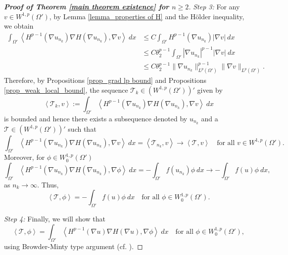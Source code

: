 \documentclass[11pt]{amsart}
\newcommand{\Fin}[1]{H^{p-1}(\nabla #1)\nabla H(\nabla #1)}
\numberwithin{equation}{section}
\begin{document}
\begin{proof}[\textbf{Proof of Theorem \ref{main theorem existence} for $n\geq 2$}]
\textit{Step 3:}
     For any $v\in W^{1,p}(\Omega')$, by Lemma \ref{lemma_properties of H} and the H\"older inequality, we obtain 
    \begin{equation*}
    \begin{split}
         \int_{\Omega'}\left<\Fin{u_{n_{k}}}, \nabla v\right> \ dx & \leq C \int_{\Omega'}H^{p-1}(\nabla u_{n_{k}}) |\nabla v| \ dx \\
         & \leq C\theta_{2}^{p-1}\int_{\Omega'} |\nabla u_{n_{k}}|^{p-1}|\nabla v|\ dx \\
         &\leq  C\theta_{2}^{p-1} \|\nabla u_{n_{k}}\|^{p-1}_{L^{p}(\Omega')} \|\nabla v\|_{L^{p}(\Omega')}.
    \end{split}
    \end{equation*}
    Therefore, by Propositions \ref{prop_grad lp bound} and Propositions \ref{prop_weak_local_bound}, the sequence $\mathcal{T}_{k}\in \left(W^{1,p}(\Omega')\right)'$ given by 
    \begin{equation*}
        \left<\mathcal{T}_{k}, v\right>:=\int_{\Omega'}\left<\Fin{u_{n_{k}}} , \nabla v\right>\ dx
    \end{equation*}
    is bounded and hence there exists a subsequence denoted by $u_{n_{k}}$ and a $\mathcal{T}\in \left(W^{1,p}(\Omega')\right)'$ such that 
    \begin{equation}\label{eqn weak convergence in dual}
        \int_{\Omega'} \left<\Fin{u_{n_{k}}}, \nabla v\right> \ dx=\left<\mathcal{T}_{n_{k}}, v\right> \to \left<\mathcal{T}, v\right> \quad \text{for all } v\in  W^{1,p}(\Omega').
    \end{equation}
    Moreover, for $\phi\in W_{0}^{1,p}(\Omega')$
    \begin{equation*}
        \int_{\Omega'} \left<\Fin{u_{n_{k}}}, \nabla \phi \right>\ dx= -\int_{\Omega'}f(u_{n_{k}})\phi \ dx \to -\int_{\Omega'}f(u)\phi \ dx,
    \end{equation*}
    as $n_{k}\to \infty$. Thus, 
    \begin{equation}\label{L equals to f}
        \left<\mathcal{T}, \phi\right>=-\int_{\Omega'}f(u)\phi \ dx \quad \text{for all } \phi\in W_{0}^{1,p}(\Omega').
    \end{equation}

    \textit{Step 4:}
    Finally, we will show that
    \begin{equation*}
        \left<\mathcal{T}, \phi\right>=\int_{\Omega'} \left<\Fin{u}, \nabla \phi \right> \ dx \quad \text{for all } \phi \in W_{0}^{1,p}(\Omega'),
    \end{equation*}
     using Browder-Minty type argument (cf. \cite{Zeidler1990,evans}).
    

\end{proof}
\end{document}
